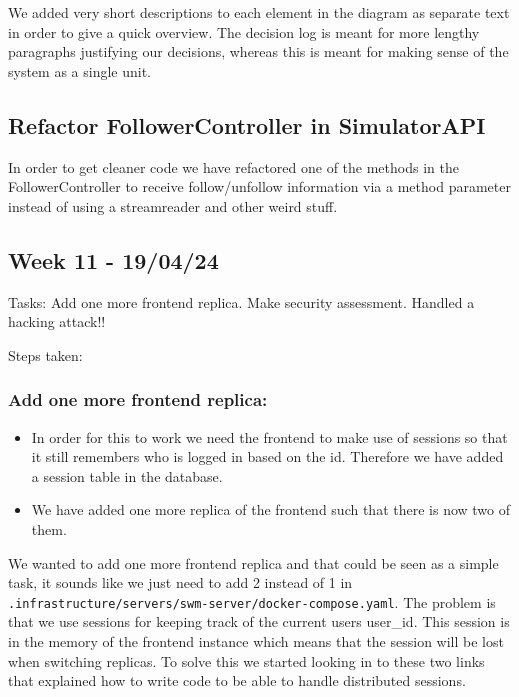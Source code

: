 We added very short descriptions to each element in the diagram as separate text in order to give a quick overview. The decision log is meant for more lengthy paragraphs justifying our decisions, whereas this is meant for making sense of the system as a single unit.

\subsection{Refactor FollowerController in SimulatorAPI}
\label{log:refactor-followercontroller-in-simulatorapi}

In order to get cleaner code we have refactored one of the methods in the FollowerController to receive follow/unfollow information via a method parameter instead of using a streamreader and other weird stuff.

\subsection{Week 11 - 19/04/24}
\label{log:week11}

Tasks: Add one more frontend replica. Make security assessment. Handled
a hacking attack!!

Steps taken:

\subsubsection{Add one more frontend replica:}
\label{log:add-one-more-frontend-replica}

\begin{itemize}
    \item In order for this to work we need the frontend to make use of sessions so that it still remembers who is logged in based on the id. Therefore we have added a session table in the database.
    \item We have added one more replica of the frontend such that there is now two of them.
\end{itemize}

We wanted to add one more frontend replica and that could be seen as a simple task, it sounds like we just need to add 2 instead of 1 in \texttt{.infrastructure/servers/swm-server/docker-compose.yaml}. The problem is that we use sessions for keeping track of the current users user\_id. This session is in the memory of the frontend instance which means that the session will be lost when switching replicas. To solve this we started looking in to these two links that explained how to write code to be able to handle distributed sessions.

